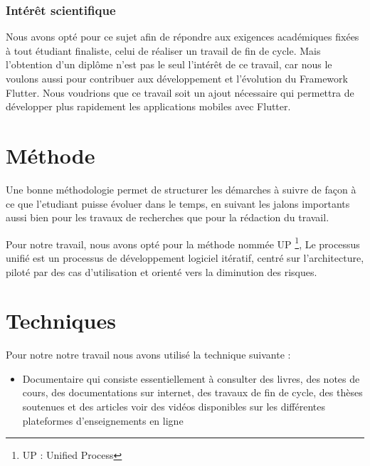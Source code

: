 \documentclass[a4paper,12pt]{report}
\begin{document}
                \subsubsection*{Intérêt scientifique}
                    Nous avons opté pour ce sujet afin de répondre aux exigences académiques fixées à tout étudiant finaliste, 
                    celui de réaliser un travail de fin de cycle. Mais l’obtention d’un diplôme n’est pas le seul l'intérêt de ce travail, 
                    car nous le voulons aussi pour contribuer aux développement et l'évolution du Framework Flutter.  
                    Nous voudrions que ce travail 
                    soit un ajout nécessaire qui permettra de développer plus rapidement les applications mobiles avec Flutter.
            
            \section*{Méthode}
                Une bonne méthodologie permet de structurer les démarches à suivre de façon à ce que l’etudiant puisse évoluer 
                dans le temps, en suivant les jalons importants aussi bien pour les travaux de recherches que pour la 
                rédaction du travail.

                Pour notre travail, nous avons opté pour la méthode nommée UP \footnote{UP : Unified Process},
                Le processus unifié est un processus de développement logiciel itératif, centré sur l'architecture, 
                piloté par des cas d'utilisation et orienté vers la diminution des risques.
            
            \section*{Techniques}
                Pour notre notre travail nous avons utilisé la technique suivante :
                \begin{itemize}
                    \item Documentaire qui consiste essentiellement à consulter des livres, 
                          des notes de cours, des documentations sur internet, des travaux de fin de cycle, 
                          des thèses soutenues et des articles voir des vidéos disponibles sur les différentes plateformes 
                          d’enseignements en ligne
                \end{itemize}
\end{document}
